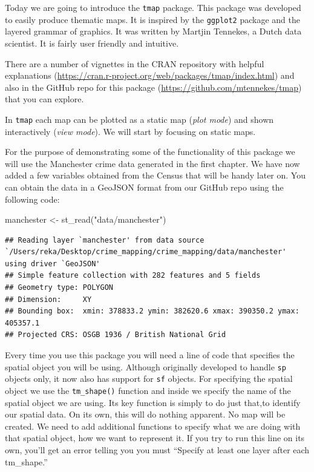 \documentclass[
]{book}
\newenvironment{Shaded}{\begin{snugshade}}{\end{snugshade}}
\newcommand{\FunctionTok}[1]{\textcolor[rgb]{0.00,0.00,0.00}{#1}}
\newcommand{\NormalTok}[1]{#1}
\newcommand{\OtherTok}[1]{\textcolor[rgb]{0.56,0.35,0.01}{#1}}
\newcommand{\StringTok}[1]{\textcolor[rgb]{0.31,0.60,0.02}{#1}}
\begin{document}
Today we are going to introduce the \texttt{tmap} package. This package was developed to easily produce thematic maps. It is inspired by the \texttt{ggplot2} package and the layered grammar of graphics. It was written by Martjin Tennekes, a Dutch data scientist. It is fairly user friendly and intuitive.

There are a number of vignettes in the CRAN repository with helpful explanations (\url{https://cran.r-project.org/web/packages/tmap/index.html}) and also in the GitHub repo for this package (\url{https://github.com/mtennekes/tmap}) that you can explore.

In \texttt{tmap} each map can be plotted as a static map (\emph{plot mode}) and shown interactively (\emph{view mode}). We will start by focusing on static maps.

For the purpose of demonstrating some of the functionality of this package we will use the Manchester crime data generated in the first chapter. We have now added a few variables obtained from the Census that will be handy later on. You can obtain the data in a GeoJSON format from our GitHub repo using the following code:

\begin{Shaded}
\begin{Highlighting}[]
\NormalTok{manchester }\OtherTok{\textless{}{-}} \FunctionTok{st\_read}\NormalTok{(}\StringTok{"data/manchester"}\NormalTok{)}
\end{Highlighting}
\end{Shaded}

\begin{verbatim}
## Reading layer `manchester' from data source `/Users/reka/Desktop/crime_mapping/crime_mapping/data/manchester' using driver `GeoJSON'
## Simple feature collection with 282 features and 5 fields
## Geometry type: POLYGON
## Dimension:     XY
## Bounding box:  xmin: 378833.2 ymin: 382620.6 xmax: 390350.2 ymax: 405357.1
## Projected CRS: OSGB 1936 / British National Grid
\end{verbatim}

Every time you use this package you will need a line of code that specifies the spatial object you will be using. Although originally developed to handle \texttt{sp} objects only, it now also has support for \texttt{sf} objects. For specifying the spatial object we use the \texttt{tm\_shape()} function and inside we specify the name of the spatial object we are using. Its key function is simply to do just that,to identify our spatial data. On its own, this will do nothing apparent. No map will be created. We need to add additional functions to specify what we are doing with that spatial object, how we want to represent it. If you try to run this line on its own, you'll get an error telling you you must ``Specify at least one layer after each tm\_shape.''
\end{document}
